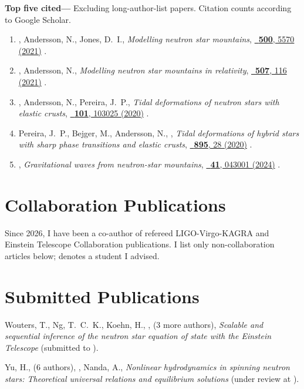 \textbf{Top five cited---}%
Excluding long-author-list papers.
Citation counts according to Google Scholar.
%
\vspace*{0.05in}
\begin{enumerate}
    \item \fgittins, Andersson, N., Jones, D.~I.,
    \textit{Modelling neutron star mountains},
    \href{https://doi.org/10.1093/mnras/staa3635}%
    {\mnras\ \textbf{500}, 5570 (2021)}
    .
    \item \fgittins, Andersson, N.,
    \textit{Modelling neutron star mountains in relativity},
    \href{https://doi.org/10.1093/mnras/stab2048}%
    {\mnras\ \textbf{507}, 116 (2021)}
    .
    \item \fgittins, Andersson, N., Pereira, J.~P.,
    \textit{Tidal deformations of neutron stars with elastic crusts},
    \href{https://doi.org/10.1103/PhysRevD.101.103025}%
    {\prd\ \textbf{101}, 103025 (2020)}
    .
    \item Pereira, J.~P., Bejger, M., Andersson, N., \fgittins,
    \textit{Tidal deformations of hybrid stars with sharp phase transitions and
    elastic crusts},
    \href{https://doi.org/10.3847/1538-4357/ab8aca}%
    {\apj\ \textbf{895}, 28 (2020)}
    .
    \item \fgittins,
    \textit{Gravitational waves from neutron-star mountains},
    \href{https://doi.org/10.1088/1361-6382/ad1c35}%
    {\cqg\ \textbf{41}, 043001 (2024)}
    .
\end{enumerate}
\else%
\fi

\section{Collaboration Publications}

Since 2026, I have been a co-author of refereed LIGO-Virgo-KAGRA and
Einstein Telescope Collaboration publications.
I list only non-collaboration articles below; \advisedStudent{} denotes a student
I advised.

\section{Submitted Publications}

\begin{publist}
    \item \advisedStudent{}Wouters, T., Ng, T.~C.~K., Koehn, H., \fgittins,
    (3 more authors),
    \textit{Scalable and sequential inference of the neutron star equation of
    state with the Einstein Telescope}
    (submitted to \prl).
    \item Yu, H., (6 authors), \fgittins, Nanda, A.,
    \textit{Nonlinear hydrodynamics in spinning neutron stars: Theoretical
    universal relations and equilibrium solutions}
    (under review at \prd).
\end{publist}

